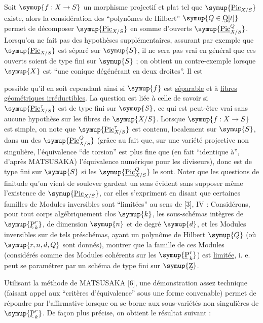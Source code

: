 
Soit $\symup{f:X\to S}$ un morphisme projectif et plat tel que
$\symup{\underline{\operatorname{Pic}}_{X/S}}$ existe, alors la considération des ``polynômes de
Hilbert'' $\symup{Q\in\text{\uwave{Q}}[t]}$ permet de décomposer
$\symup{\underline{\operatorname{Pic}}_{X/S}}$ en somme d'ouverts
$\symup{\underline{\operatorname{Pic}}_{X/S}^Q}$. Lorsqu'on ne fait pas des hypothèses
supplémentaires, assurant par exemple que $\symup{\underline{\operatorname{Pic}}_{X/S}}$ est séparé
sur $\symup{S}$, il ne sera pas vrai en général que ces ouverts soient de type fini sur
$\symup{S}$ ; on obtient un contre-exemple lorsque $\symup{X}$ est ``une conique dégénérant en
deux droites''. Il est

possible qu'il en soit cependant ainsi si $\symup{f}$ est \uline{séparable} et à \uline{fibres
géométriques irréductibles}. La question est liée à celle de savoir si
$\symup{\underline{\operatorname{Pic}}_{X/S}^\tau}$ est de type fini sur $\symup{S}$, ce qui est peut-être
vrai sans aucune hypothèse sur les fibres de $\symup{X/S}$. Lorsque
$\symup{f:X\to S}$ est simple, on note que
$\symup{\underline{\operatorname{Pic}}_{X/S}^\tau}$ est contenu, localement sur $\symup{S}$, dans un des
$\symup{\underline{\operatorname{Pic}}_{X/S}^Q}$ (grâce au fait que, sur une variété projective
non singulière, l'équivalence ``de torsion'' est plus fine que (en fait
``identique à'', d'après MATSUSAKA) l'équivalence numérique pour les
diviseurs), donc est de type fini sur $\symup{S}$ si les
$\symup{\underline{\operatorname{Pic}}_{X/S}^Q}$ le sont. Noter que les questions de finitude qu'on
vient de soulever gardent un sens évident sans supposer même l'existence de
$\symup{\underline{\operatorname{Pic}}_{X/S}}$, car elles s'expriment en disant que certaines
familles de Modules inversibles sont ``limitées'' au sens de [3], IV :
Considérons, pour tout corps algébriquement clos $\symup{k}$, les sous-schémas intègres
de $\symup{\text{\uwave{P}}_k^r}$, de dimension $\symup{n}$ et de degré $\symup{d}$, et les Modules
inversibles sur de tels préschémas, ayant un polynôme de Hilbert $\symup{Q}$ (où
$\symup{r,n,d,Q}$ sont donnés), montrer que la famille de ces Modules (considérés
comme des Modules cohérents sur les $\symup{\text{\uwave{P}}_k^r}$) est \uline{limitée}, i. e. peut se
paramétrer par un schéma de type fini sur $\symup{\text{\uwave{Z}}}$.

Utilisant la méthode de MATSUSAKA [6], une démonstration assez technique
(faisant appel aux ``critères d'équivalence'' sous une forme convenable) permet
de répondre par l'affirmative lorsque on se borne aux sous-variétés non
singulières de $\symup{\text{\uwave{P}}_k^r}$. De façon plus précise, on obtient le résultat
suivant :

